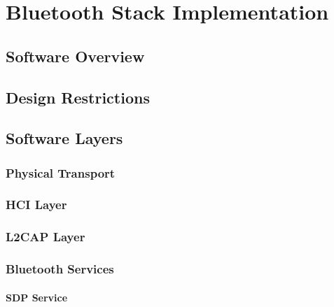 \chapter{Bluetooth Stack Implementation}
\label{Chapter 3}


\section{Software Overview}


\section{Design Restrictions}


\section{Software Layers}


\FloatBarrier
\subsection{Physical Transport}


\FloatBarrier
\subsection{HCI Layer}


\FloatBarrier
\subsection{L2CAP Layer}


\FloatBarrier
\subsection{Bluetooth Services}


\FloatBarrier
\subsubsection{SDP Service}

